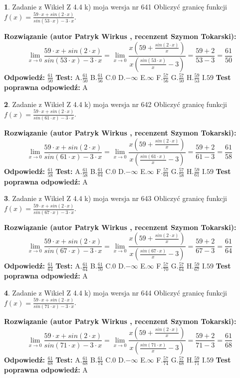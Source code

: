 \documentclass[12pt, a4paper]{article}
\theoremstyle{definition} %
\newtheorem{zad}{}
\newcommand{\zadStart}[1]{\begin{zad}#1\newline}
\newcommand{\zadStop}{\end{zad}}
\newcommand{\rozwStart}[2]{\noindent \textbf{Rozwiązanie (autor #1 , recenzent #2): }\newline}
\newcommand{\rozwStop}{\newline}
\newcommand{\odpStart}{\noindent \textbf{Odpowiedź:}\newline}
\newcommand{\odpStop}{\newline}
\newcommand{\testStart}{\noindent \textbf{Test:}\newline}
\newcommand{\testStop}{\newline}
\newcommand{\kluczStart}{\noindent \textbf{Test poprawna odpowiedź:}\newline}
\newcommand{\kluczStop}{\newline}
\begin{document}
\zadStart{Zadanie z Wikieł Z 4.4 k) moja wersja nr 641}
Obliczyć granicę funkcji $f(x)=\frac{59\cdot x +sin(2\cdot x)}{sin(53\cdot x) -3\cdot x}$.
\zadStop
\rozwStart{Patryk Wirkus}{Szymon Tokarski}
$$\lim\limits_{x\to 0}\frac{59\cdot x +sin(2\cdot x)}{sin(53\cdot x) -3\cdot x}
=\lim\limits_{x\to 0}\frac{x(59+\frac{sin(2\cdot x)}{x})}{x(\frac{sin(53\cdot x)}{x}-3)}
=\frac{59+2}{53-3} = \frac{61}{50}$$
\rozwStop
\odpStart
$\frac{61}{50}$
\odpStop
\testStart
A.$\frac{61}{50}$
B.$\frac{61}{56}$
C.$0$
D.$-\infty$
E.$\infty$
F.$\frac{57}{56}$
G.$\frac{57}{50}$
H.$\frac{59}{53}$
I.$59$
\testStop
\kluczStart
A
\kluczStop



\zadStart{Zadanie z Wikieł Z 4.4 k) moja wersja nr 642}
Obliczyć granicę funkcji $f(x)=\frac{59\cdot x +sin(2\cdot x)}{sin(61\cdot x) -3\cdot x}$.
\zadStop
\rozwStart{Patryk Wirkus}{Szymon Tokarski}
$$\lim\limits_{x\to 0}\frac{59\cdot x +sin(2\cdot x)}{sin(61\cdot x) -3\cdot x}
=\lim\limits_{x\to 0}\frac{x(59+\frac{sin(2\cdot x)}{x})}{x(\frac{sin(61\cdot x)}{x}-3)}
=\frac{59+2}{61-3} = \frac{61}{58}$$
\rozwStop
\odpStart
$\frac{61}{58}$
\odpStop
\testStart
A.$\frac{61}{58}$
B.$\frac{61}{64}$
C.$0$
D.$-\infty$
E.$\infty$
F.$\frac{57}{64}$
G.$\frac{57}{58}$
H.$\frac{59}{61}$
I.$59$
\testStop
\kluczStart
A
\kluczStop



\zadStart{Zadanie z Wikieł Z 4.4 k) moja wersja nr 643}
Obliczyć granicę funkcji $f(x)=\frac{59\cdot x +sin(2\cdot x)}{sin(67\cdot x) -3\cdot x}$.
\zadStop
\rozwStart{Patryk Wirkus}{Szymon Tokarski}
$$\lim\limits_{x\to 0}\frac{59\cdot x +sin(2\cdot x)}{sin(67\cdot x) -3\cdot x}
=\lim\limits_{x\to 0}\frac{x(59+\frac{sin(2\cdot x)}{x})}{x(\frac{sin(67\cdot x)}{x}-3)}
=\frac{59+2}{67-3} = \frac{61}{64}$$
\rozwStop
\odpStart
$\frac{61}{64}$
\odpStop
\testStart
A.$\frac{61}{64}$
B.$\frac{61}{70}$
C.$0$
D.$-\infty$
E.$\infty$
F.$\frac{57}{70}$
G.$\frac{57}{64}$
H.$\frac{59}{67}$
I.$59$
\testStop
\kluczStart
A
\kluczStop



\zadStart{Zadanie z Wikieł Z 4.4 k) moja wersja nr 644}
Obliczyć granicę funkcji $f(x)=\frac{59\cdot x +sin(2\cdot x)}{sin(71\cdot x) -3\cdot x}$.
\zadStop
\rozwStart{Patryk Wirkus}{Szymon Tokarski}
$$\lim\limits_{x\to 0}\frac{59\cdot x +sin(2\cdot x)}{sin(71\cdot x) -3\cdot x}
=\lim\limits_{x\to 0}\frac{x(59+\frac{sin(2\cdot x)}{x})}{x(\frac{sin(71\cdot x)}{x}-3)}
=\frac{59+2}{71-3} = \frac{61}{68}$$
\rozwStop
\odpStart
$\frac{61}{68}$
\odpStop
\testStart
A.$\frac{61}{68}$
B.$\frac{61}{74}$
C.$0$
D.$-\infty$
E.$\infty$
F.$\frac{57}{74}$
G.$\frac{57}{68}$
H.$\frac{59}{71}$
I.$59$
\testStop
\kluczStart
A
\kluczStop
\end{document}
